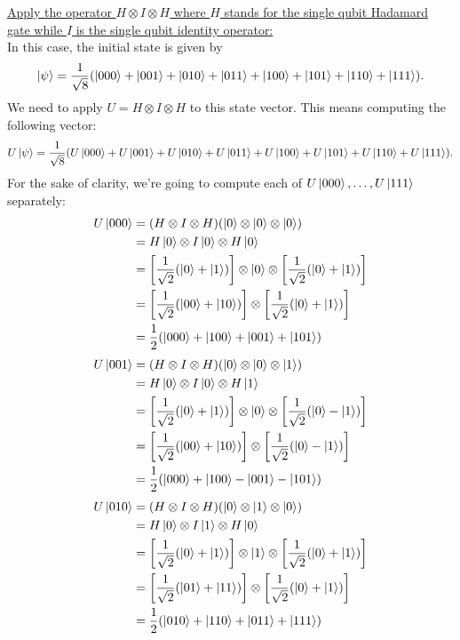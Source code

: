 \documentclass[11pt]{article}
\newcommand{\invroot}[1]{\frac{1}{\sqrt{#1}}}
\begin{document}
\uline{Apply the operator \(H\otimes I\otimes H\) where \(H\) stands for the single
qubit Hadamard gate while \(I\) is the single qubit identity operator:}\\
In this case, the initial state is given by
\begin{equation}
\ket{\psi}=\invroot{8}(\ket{000}+\ket{001}+\ket{010}+\ket{011}+\ket{100}+\ket{101}+\ket{110}+\ket{111}).
\end{equation}
We need to apply \(U=H\otimes I\otimes H\) to this state vector. This means
computing the following vector:
\begin{equation}
U\ket{\psi}=\invroot{8}(U\ket{000}+U\ket{001}+U\ket{010}+U\ket{011}+U\ket{100}+U\ket{101}+U\ket{110}+U\ket{111}).
\end{equation}
For the sake of clarity, we're going to compute each of
\(U\ket{000},\ldots,U\ket{111}\) separately:
\begin{align}
  \begin{split}
    U\ket{000}&=(H\otimes I\otimes H)(\ket{0}\otimes\ket{0}\otimes\ket{0})\\
    &=H\ket{0}\otimes I\ket{0}\otimes H\ket{0}\\
    &=\left[\invroot{2}(\ket{0}+\ket{1})\right]\otimes\ket{0}\otimes\left[\invroot{2}(\ket{0}+\ket{1})\right]\\
    &=\left[\invroot{2}(\ket{00}+\ket{10})\right]\otimes\left[\invroot{2}(\ket{0}+\ket{1})\right]\\
    &=\frac{1}{2}(\ket{000}+\ket{100}+\ket{001}+\ket{101})
  \end{split}
\end{align}
\begin{align}
  \begin{split}
    U\ket{001}&=(H\otimes I\otimes H)(\ket{0}\otimes\ket{0}\otimes\ket{1})\\
    &=H\ket{0}\otimes I\ket{0}\otimes H\ket{1}\\
    &=\left[\invroot{2}(\ket{0}+\ket{1})\right]\otimes\ket{0}\otimes\left[\invroot{2}(\ket{0}-\ket{1})\right]\\
    &=\left[\invroot{2}(\ket{00}+\ket{10})\right]\otimes\left[\invroot{2}(\ket{0}-\ket{1})\right]\\
    &=\frac{1}{2}(\ket{000}+\ket{100}-\ket{001}-\ket{101})
  \end{split}
\end{align}
\begin{align}
  \begin{split}
    U\ket{010}&=(H\otimes I\otimes H)(\ket{0}\otimes\ket{1}\otimes\ket{0})\\
    &=H\ket{0}\otimes I\ket{1}\otimes H\ket{0}\\
    &=\left[\invroot{2}(\ket{0}+\ket{1})\right]\otimes\ket{1}\otimes\left[\invroot{2}(\ket{0}+\ket{1})\right]\\
    &=\left[\invroot{2}(\ket{01}+\ket{11})\right]\otimes\left[\invroot{2}(\ket{0}+\ket{1})\right]\\
    &=\frac{1}{2}(\ket{010}+\ket{110}+\ket{011}+\ket{111})
  \end{split}
\end{align}
\end{document}
